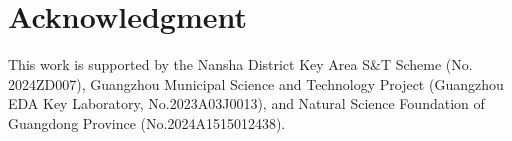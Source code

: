 \section*{Acknowledgment}
\label{sec:ack}

This work is supported by the Nansha District Key Area S\&T Scheme (No. 2024ZD007), Guangzhou Municipal Science and Technology Project (Guangzhou EDA Key Laboratory, No.2023A03J0013), and Natural Science Foundation of Guangdong Province (No.2024A1515012438).